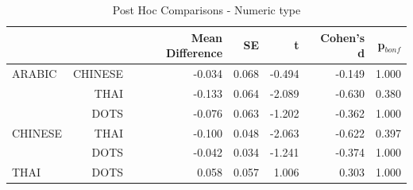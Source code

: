 \begin{table}[ht]
	\centering
	\caption{Post Hoc Comparisons - Numeric type}
	\begin{tabular}{lrrrrrr}
		\hline
		 &  & Mean Difference & SE & t & Cohen's d & p$_{bonf}$  \\
		\hline
		ARABIC & CHINESE & -0.034 & 0.068 & -0.494 & -0.149 & 1.000  \\
		  & THAI & -0.133 & 0.064 & -2.089 & -0.630 & 0.380  \\
		 & DOTS & -0.076 & 0.063 & -1.202 & -0.362 & 1.000  \\
		CHINESE & THAI & -0.100 & 0.048 & -2.063 & -0.622 & 0.397  \\
		  & DOTS & -0.042 & 0.034 & -1.241 & -0.374 & 1.000  \\
		THAI & DOTS & 0.058 & 0.057 & 1.006 & 0.303 & 1.000  \\
		\hline
	\end{tabular} 
	\label{tab:LangLvlCompare_Cross}
\end{table}

